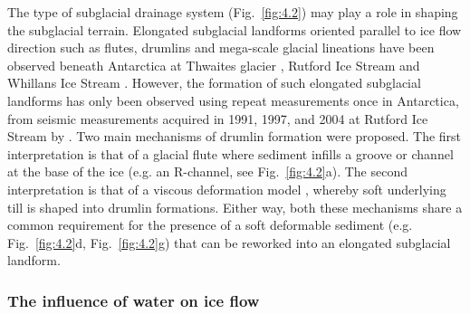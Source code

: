 The type of subglacial drainage system (Fig.~\ref{fig:4.2}) may play a role in shaping the subglacial terrain.
Elongated subglacial landforms oriented parallel to ice flow direction such as flutes, drumlins and mega-scale glacial lineations \citep[see][]{Elysubglacialbedformscomprise2016} have been observed beneath Antarctica at Thwaites glacier \citep{HolschuhLinkingpostglaciallandscapes2020}, Rutford Ice Stream \citep{KingSubglaciallandformsRutford2016} and Whillans Ice Stream \citep{RooneyTillicestream1987}.
However, the formation of such elongated subglacial landforms has only been observed using repeat measurements once in Antarctica, from seismic measurements acquired in 1991, 1997, and 2004 at Rutford Ice Stream by \citet{SmithRapiderosiondrumlin2007}.
Two main mechanisms of drumlin formation were proposed.
The first interpretation is that of a glacial flute \citep{BoultonOriginGlaciallyFluted1976} where sediment infills a groove or channel at the base of the ice (e.g. an R-channel, see Fig.~\ref{fig:4.2}a).
The second interpretation is that of a viscous deformation model \citep[e.g.][]{HindmarshDrumlinizationdrumlinforminginstabilities1998}, whereby soft underlying till is shaped into drumlin formations.
Either way, both these mechanisms share a common requirement for the presence of a soft deformable sediment (e.g. Fig.~\ref{fig:4.2}d, Fig.~\ref{fig:4.2}g) that can be reworked into an elongated subglacial landform.

\subsubsection{The influence of water on ice flow} \label{sec:influenceofwateroniceflow}

